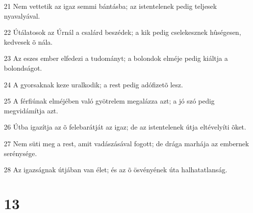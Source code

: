 \par 21 Nem vettetik az igaz semmi bántásba; az istentelenek pedig teljesek nyavalyával.
\par 22 Útálatosok az Úrnál a csalárd beszédek; a kik pedig cselekesznek hûségesen, kedvesek õ nála.
\par 23 Az eszes ember elfedezi a tudományt; a bolondok elméje pedig kiáltja a bolondságot.
\par 24 A gyorsaknak keze uralkodik; a rest pedig adófizetõ lesz.
\par 25 A férfiúnak elméjében való gyötrelem megalázza azt; a jó szó pedig megvidámítja azt.
\par 26 Útba igazítja az õ felebarátját az igaz; de az istentelenek útja eltévelyíti õket.
\par 27 Nem süti meg a rest, amit vadászásával fogott; de drága marhája az embernek serénysége.
\par 28 Az igazságnak útjában van élet; és az õ ösvényének úta halhatatlanság.

\chapter{13}

